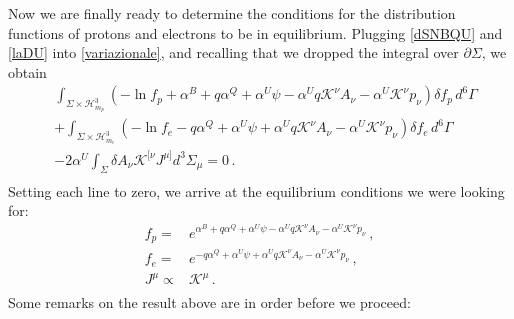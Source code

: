 \documentclass[a4paper, amsfonts, amssymb, amsmath, reprint, showkeys, nofootinbib, twoside, onecolumn,notitlepage]{revtex4-1}
\newcommand{\K}{{\mathcal{K}}}
\theoremstyle{definition}
\theoremstyle{theorem}
\begin{document}
Now we are finally ready to determine the conditions for the distribution functions of protons and electrons to be in equilibrium.
Plugging \eqref{dSNBQU} and \eqref{laDU} into \eqref{variazionale}, and recalling that we dropped the integral over $\partial \Sigma$, we obtain
\begin{equation}
\begin{split}
& \int_{\Sigma \times \mathcal{H}^3_{m_p}} ({-}  \ln f_p +\alpha^B+q\alpha^Q +\alpha^U\psi -\alpha^U q\K^\nu A_\nu -\alpha^U \K^\nu p_\nu) \delta f_p \, d^6\Gamma  \\
&+ \int_{\Sigma \times \mathcal{H}^3_{m_e}} ({-}  \ln f_e -q\alpha^Q +\alpha^U\psi +\alpha^U q\K^\nu A_\nu -\alpha^U \K^\nu p_\nu) \delta f_e \, d^6\Gamma  \\
& -2\alpha^U \int_\Sigma  \delta A_\nu \K^{ [\nu}J^{\mu]} d^3\Sigma_\mu =0 \, . \\
\end{split}
\end{equation}
Setting each line to zero, we arrive at the equilibrium conditions we were looking for: 
\begin{equation}\label{fpfe}
    \begin{split}
f_p={}& e^{\alpha^B+q\alpha^Q +\alpha^U\psi -\alpha^U q\K^\nu A_\nu -\alpha^U \K^\nu p_\nu} \, , \\
f_e={}& e^{-q\alpha^Q +\alpha^U\psi +\alpha^U q\K^\nu A_\nu -\alpha^U \K^\nu p_\nu} \, , \\
J^\mu \propto{}& \K^\mu \, . \\
    \end{split}
\end{equation}
Some remarks on the result above are in order before we proceed:
\end{document}
